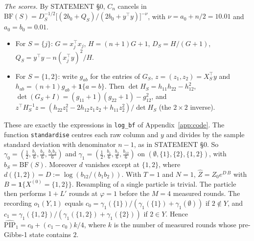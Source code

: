 \documentclass[11pt]{article}
\theoremstyle{remark}
\newcommand{\Zh}{\widehat Z}
\newcommand{\PIPh}{\widehat{\mathrm{PIP}}}
\newcommand{\ind}{\mathbf 1}
\begin{document}
\emph{The scores.} By STATEMENT \S0, $C_n$ cancels in $\mathrm{BF}(S)=D_S^{-1/2}\big[(2b_0+Q_S)/(2b_0+y^\top y)\big]^{-\nu}$, with $\nu=a_0+n/2=10.01$ and $a_0=b_0=0.01$.
\begin{itemize}
\item For $S=\{j\}$: $G=x_j^\top x_j$, $H=(n+1)G+1$, $D_S=H/(G+1)$, $Q_S=y^\top y-n(x_j^\top y)^2/H$.
\item For $S=\{1,2\}$: write $g_{ab}$ for the entries of $G_S$, $z=(z_1,z_2)=X_S^\top y$ and $h_{ab}=(n+1)g_{ab}+\ind\{a=b\}$. Then $\det H_S=h_{11}h_{22}-h_{12}^2$, $\det(G_S+I)=(g_{11}+1)(g_{22}+1)-g_{12}^2$, and $z^\top H_S^{-1}z=(h_{22}z_1^2-2h_{12}z_1z_2+h_{11}z_2^2)/\det H_S$ (the $2\times2$ inverse).
\end{itemize}
These are exactly the expressions in \texttt{log\_bf} of Appendix~\ref{app:code}. The function \texttt{standardise} centres each raw column and $y$ and divides by the sample standard deviation with denominator $n-1$, as in STATEMENT \S0. So $\gamma_0=(\frac12,\frac{b_1}6,\frac{b_2}6,\frac{b_1b_2}6)$ and $\gamma_1=(\frac12,\frac{b_1}6,\frac{b_2}6,\frac{b_{12}}6)$ on $(\emptyset,\{1\},\{2\},\{1,2\})$, with $b_S=\mathrm{BF}(S)$. Moreover $d$ vanishes except at $\{1,2\}$, where $d(\{1,2\})=D:=\log(b_{12}/(b_1b_2))$. With $T=1$ and $N=1$, $\Zh=Z_0e^{D\,B}$ with $B=\ind\{X^{(0)}=\{1,2\}\}$. Resampling of a single particle is trivial. The particle then performs $1+L'$ rounds at $\varphi=1$ before the $M=4$ measured rounds. The recording $o_1(Y,1)$ equals $c_0=\gamma_1(\{1\})/(\gamma_1(\{1\})+\gamma_1(\emptyset))$ if $2\notin Y$, and $c_1=\gamma_1(\{1,2\})/(\gamma_1(\{1,2\})+\gamma_1(\{2\}))$ if $2\in Y$. Hence $\PIPh_1=c_0+(c_1-c_0)k/4$, where $k$ is the number of measured rounds whose pre-Gibbs-1 state contains $2$.
\end{document}
